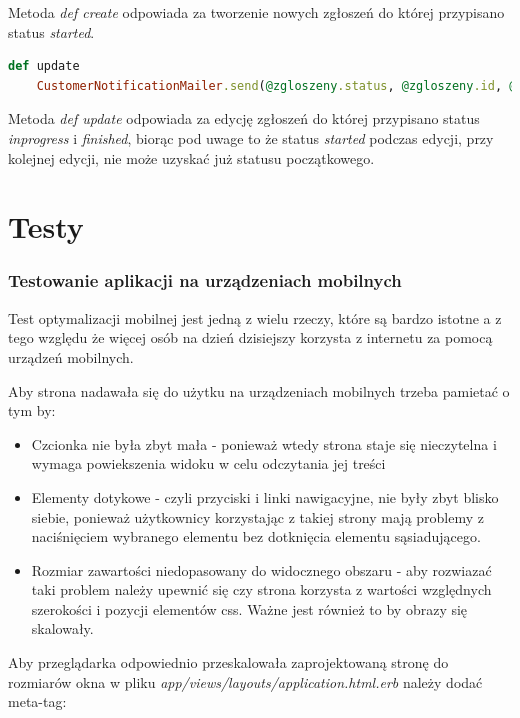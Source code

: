 \documentclass[openright]{xmgr}
\begin{document}
	Metoda \textit{def create} odpowiada za tworzenie nowych zgłoszeń do której przypisano status \textit{started}.
	
	\begin{lstlisting}[language=Ruby,lineskip={-1pt},caption=Powiadomienia o rozpoczeciu i zakończeniu naprawy usterki]
	def update
	CustomerNotificationMailer.send(@zgloszeny.status, @zgloszeny.id, @zgloszeny.user_id).deliver_later if !@zgloszeny.started?
	\end{lstlisting}
	
	Metoda \textit{def update} odpowiada za edycję zgłoszeń do której przypisano status \textit{inprogress} i \textit{finished}, biorąc pod uwage to że status \textit{started} podczas edycji, przy kolejnej edycji, nie może  uzyskać już statusu początkowego.
	
	\chapter{Testy}
	
	\subsection{Testowanie aplikacji na urządzeniach mobilnych}
	
	Test optymalizacji mobilnej jest jedną z wielu rzeczy, które są bardzo istotne a z tego względu że więcej osób na dzień dzisiejszy korzysta z internetu za pomocą urządzeń mobilnych. 

	Aby strona nadawała się do użytku na urządzeniach mobilnych trzeba pamietać o tym by:
	
	\begin{itemize}
		\item Czcionka nie była zbyt mała - ponieważ wtedy strona staje się nieczytelna i wymaga powiekszenia widoku w celu odczytania jej treści 
		\item Elementy dotykowe - czyli przyciski i linki nawigacyjne, nie były zbyt blisko siebie, ponieważ użytkownicy korzystając z takiej strony mają problemy z naciśnięciem wybranego elementu bez dotknięcia elementu sąsiadującego.
		\item Rozmiar zawartości niedopasowany do widocznego obszaru - aby rozwiazać taki problem należy upewnić się czy strona korzysta z wartości względnych szerokości i pozycji elementów css. Ważne jest również to by obrazy się skalowały.
	\end{itemize}
	
	Aby przeglądarka odpowiednio przeskalowała zaprojektowaną stronę do rozmiarów okna w pliku \textit{app/views/layouts/application.html.erb} należy dodać meta-tag:
	
\end{document}
